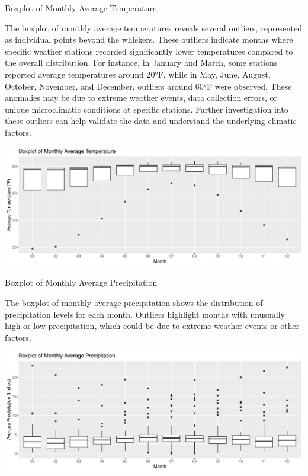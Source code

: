 \documentclass[
]{article}
\begin{document}
Boxplot of Monthly Average Temperature

\justifying

The boxplot of monthly average temperatures reveals several outliers,
represented as individual points beyond the whiskers. These outliers
indicate months where specific weather stations recorded significantly
lower temperatures compared to the overall distribution. For instance,
in January and March, some stations reported average temperatures around
20°F, while in May, June, August, October, November, and December,
outliers around 60°F were observed. These anomalies may be due to
extreme weather events, data collection errors, or unique microclimatic
conditions at specific stations. Further investigation into these
outliers can help validate the data and understand the underlying
climatic factors.

\includegraphics{climate_files/figure-latex/monthly_avg_temp_boxplot-1.pdf}

Boxplot of Monthly Average Precipitation

\justifying

The boxplot of monthly average precipitation shows the distribution of
precipitation levels for each month. Outliers highlight months with
unusually high or low precipitation, which could be due to extreme
weather events or other factors.

\includegraphics{climate_files/figure-latex/monthly_avg_precip_boxplot-1.pdf}
\end{document}
